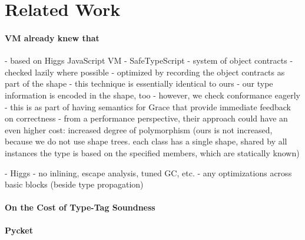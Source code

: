 
\section{Related Work}

\paragraph{VM already knew that}

\begin{cnote}
- based on Higgs JavaScript VM
- SafeTypeScript
  - system of object contracts
  - checked lazily where possible
  - optimized by recording the object contracts as part of the shape
  - this technique is essentially identical to ours
    - our type information is encoded in the shape, too
    - however, we check conformance eagerly
      - this is as part of having semantics for Grace that provide immediate
        feedback on correctness
    - from a performance perspective, their approach could have an even higher
      cost: increased degree of polymorphism (ours is not increased,
      because we do not use shape trees.
      each class has a single shape, shared by all instances
      the type is based on the specified members, which are statically known)

- Higgs
  - no inlining, escape analysis, tuned GC, etc.
  - any optimizations across basic blocks (beside type propagation)

\end{cnote}


\paragraph{On the Cost of Type-Tag Soundness}
\paragraph{Pycket}
